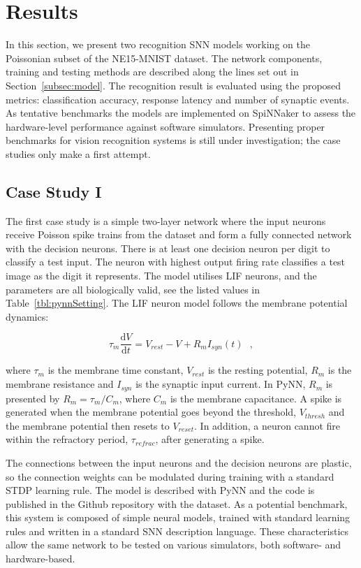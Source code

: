 \documentclass{frontiersENG} %
\def\D{\mathrm{d}}
\begin{document}
\section{Results}
\label{sec:test}
In this section, we present two recognition SNN models working on the Poissonian subset of the NE15-MNIST dataset.
The network components, training and testing methods are described along the lines set out in Section~\ref{subsec:model}.
The recognition result is evaluated using the proposed metrics: classification accuracy, response latency and number of synaptic events.
As tentative benchmarks the models are implemented on SpiNNaker to assess the hardware-level performance against software simulators.
Presenting proper benchmarks for vision recognition systems is still under investigation; the case studies only make a first attempt.

\subsection{Case Study I}
The first case study is a simple two-layer network where the input neurons receive Poisson spike trains from the dataset and form a fully connected network with the decision neurons.
There is at least one decision neuron per digit to classify a test input.
The neuron with highest output firing rate classifies a test image as the digit it represents.
The model utilises LIF neurons, and the parameters are all biologically valid, see the listed values in Table~\ref{tbl:pynnSetting}.
The LIF neuron model follows the membrane potential dynamics:

\begin{equation}
\tau_m \frac{\D V}{\D t}=V_{rest} - V + R_{m} I_{syn}(t) ~~~,
\label{eq:LIF}
\end{equation}

where $\tau_m$ is the membrane time constant, $ V_{rest} $ is the resting potential, $ R_{m} $ is the membrane resistance and $ I_{syn} $ is the synaptic input current.
In PyNN, $ R_{m} $ is presented by $ R_{m}=\tau_m/C_{m} $, where $C_{m} $ is the membrane capacitance.
A spike is generated when the membrane potential goes beyond the threshold, $ V_{thresh} $ and the membrane potential then resets to $V_{reset}$.
In addition, a neuron cannot fire within the refractory period, $ \tau_{refrac} $, after generating a spike.

The connections between the input neurons and the decision neurons are plastic, so the connection weights can be modulated during training with a standard STDP learning rule.
The model is described with PyNN and the code is published in
the Github repository with the dataset.
As a potential benchmark, this system is composed of simple neural models, trained with standard learning rules and written in a standard SNN description language. These characteristics allow the same network to be tested on various simulators, both software- and hardware-based.
\end{document}
